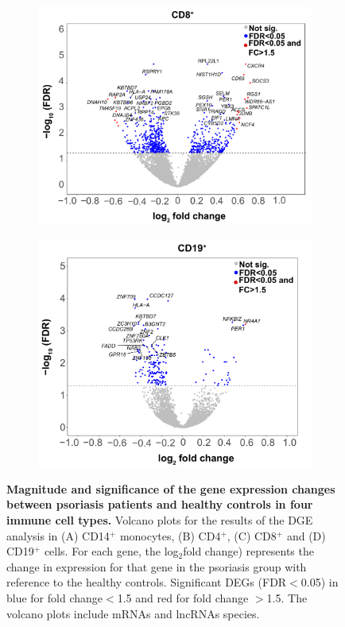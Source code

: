 \begin{figure}[htbp]
\begin{subfigure}{0.5\textwidth}
\centering
\includegraphics[width=\textwidth]{./Results2/pdfs/RNA_PS_CTL_CD8_volcano_plot}
\caption{\textbf{}}
\end{subfigure}%
\begin{subfigure}{0.5\textwidth}
\centering
\includegraphics[width=\textwidth]{./Results2/pdfs/RNA_PS_CTL_CD19_volcano_plot}
\caption{\textbf{}}
\end{subfigure}
\caption[Magnitude and significance of the gene expression changes between psoriasis patients and healthy controls in four immune cell types.]{\textbf{Magnitude and significance of the gene expression changes between psoriasis patients and healthy controls in four immune cell types.} Volcano plots for the results of the DGE analysis in (A) CD14$^+$ monocytes, (B) CD4$^+$, (C) CD8$^+$ and (D) CD19$^+$ cells. For each gene, the log$_2$fold change) represents the change in expression for that gene in the psoriasis group with reference to the healthy controls. Significant DEGs (FDR$<$0.05) in blue for fold change$<$1.5 and red for fold change $>$1.5. The volcano plots include mRNAs and lncRNAs species.}

\end{figure}

